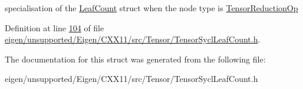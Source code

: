 specialisation of the \hyperlink{struct_eigen_1_1_tensor_sycl_1_1internal_1_1_leaf_count}{Leaf\+Count} struct when the node type is \hyperlink{class_eigen_1_1_tensor_reduction_op}{Tensor\+Reduction\+Op} 

Definition at line \hyperlink{eigen_2unsupported_2_eigen_2_c_x_x11_2src_2_tensor_2_tensor_sycl_leaf_count_8h_source_l00104}{104} of file \hyperlink{eigen_2unsupported_2_eigen_2_c_x_x11_2src_2_tensor_2_tensor_sycl_leaf_count_8h_source}{eigen/unsupported/\+Eigen/\+C\+X\+X11/src/\+Tensor/\+Tensor\+Sycl\+Leaf\+Count.\+h}.



The documentation for this struct was generated from the following file\+:\begin{DoxyCompactItemize}
\item 
eigen/unsupported/\+Eigen/\+C\+X\+X11/src/\+Tensor/\+Tensor\+Sycl\+Leaf\+Count.\+h\end{DoxyCompactItemize}
